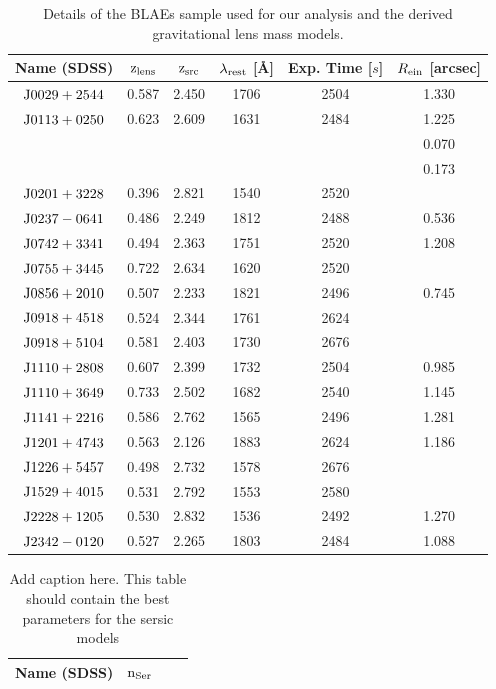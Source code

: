 \documentclass[a4paper,fleqn,usenatbib]{mnras}
\begin{document}
\begin{table}
\caption{Details of the BLAEs sample used for our analysis and the derived gravitational lens mass models.}
\begin{tabular}{cccccc}
\hline
 Name (SDSS) 	&$\rm{z_{lens}}$	&$\rm{z_{src}}$		& $\lambda_{\rm rest}$ [\AA]		&Exp. Time [$s$]	&$R_{\rm ein}$ [arcsec]\\
 \hline
$\rm{J0029+2544}$		&0.587	&2.450	&1706	&2504	&1.330\\
$\rm{J0113+0250}$		&0.623	&2.609	&1631	&2484	&1.225\\
&&&&&0.070\\
&&&&&0.173\\
$\rm{J0201+3228}$		&0.396	&2.821	&1540	&2520	&\\
$\rm{J0237-0641}$		&0.486	&2.249	&1812	&2488	&0.536\\
$\rm{J0742+3341}$		&0.494	&2.363	&1751	&2520	&1.208\\
$\rm{J0755+3445}$		&0.722	&2.634	&1620	&2520	&\\
$\rm{J0856+2010}$		&0.507	&2.233	&1821	&2496	&0.745\\
$\rm{J0918+4518}$		&0.524	&2.344	&1761	&2624	&\\
$\rm{J0918+5104}$		&0.581	&2.403	&1730	&2676	&\\
$\rm{J1110+2808}$		&0.607	&2.399	&1732	&2504	&0.985\\
$\rm{J1110+3649}$		&0.733	&2.502	&1682	&2540	&1.145\\
$\rm{J1141+2216}$		&0.586	&2.762	&1565	&2496	&1.281\\
$\rm{J1201+4743}$		&0.563	&2.126	&1883	&2624	&1.186\\
$\rm{J1226+5457}$		&0.498	&2.732	&1578	&2676	&\\
$\rm{J1529+4015}$		&0.531	&2.792	&1553	&2580	&\\
$\rm{J2228+1205}$		&0.530	&2.832	&1536	&2492	&1.270\\
$\rm{J2342-0120}$		&0.527	&2.265	&1803	&2484	&1.088\\
 \hline
\end{tabular}
\label{tbl:list} 
\end{table}


\begin{table}
\caption{Add caption here. This table should contain the best parameters for the sersic models}
\begin{tabular}{cccc}
\hline
 Name (SDSS) &$\rm{n_{Ser}}$\\
 \hline

 \hline
\end{tabular}
\label{tbl:sersic} 
\end{table}
\end{document}

